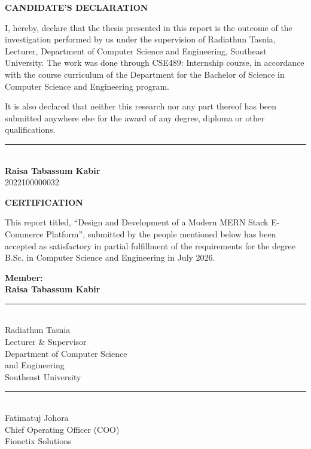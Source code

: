 \documentclass[12pt,a4paper]{report}
\begin{document}
\newpage
{}
\begin{center}
    {\fontsize{14}{16}\selectfont \textbf{CANDIDATE'S DECLARATION}}
\end{center}
\vspace{1.5cm}

\noindent I, hereby, declare that the thesis presented in this report is the outcome of the investigation performed by us under the supervision of Radiathun Tasnia, Lecturer, Department of Computer Science and Engineering, Southeast University. The work was done through CSE489: Internship course, in accordance with the course curriculum of the Department for the Bachelor of Science in Computer Science and Engineering program.

It is also declared that neither this research nor any part thereof has been submitted anywhere else for the award of any degree, diploma or other qualifications.

\vspace{3cm}
\noindent
\rule{5cm}{0.4pt}\\
\textbf{Raisa Tabassum Kabir}\\
2022100000032

\newpage
{}
\begin{center}
    {\fontsize{14}{16}\selectfont \textbf{CERTIFICATION}}
\end{center}
\vspace{1.5cm}

\noindent This report titled, ``Design and Development of a Modern MERN Stack E-Commerce Platform'', submitted by the people mentioned below has been accepted as satisfactory in partial fulfillment of the requirements for the degree B.Sc. in Computer Science and Engineering in July 2026.

\vspace{1cm}
\noindent \textbf{Member:}\\
\vspace{0.2cm}
\noindent \textbf{Raisa Tabassum Kabir }

\vspace{2.5cm}
\noindent
\begin{minipage}[t]{0.45\textwidth}
\rule{5cm}{0.4pt}\\
Radiathun Tasnia\\
Lecturer \& Supervisor\\
Department of Computer Science\\
and Engineering\\
Southeast University
\end{minipage}
\hfill
\begin{minipage}[t]{0.45\textwidth}
\rule{5cm}{0.4pt}\\
Fatimatuj Johora\\
Chief Operating Officer (COO)\\
Fionetix Solutions
\end{minipage}
\end{document}
